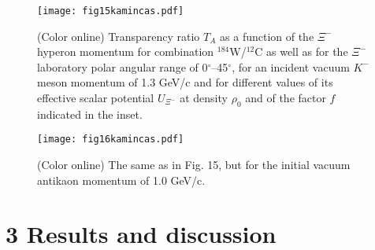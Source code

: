 \documentclass[12pt]{article}
\begin{document}
\begin{figure}[!h]
\begin{center}
\texttt{[image: fig15kamincas.pdf]}
\vspace*{-2mm} \caption{(Color online) Transparency ratio $T_A$ as a function of the $\Xi^-$  hyperon momentum
for combination $^{184}$W/$^{12}$C as well as for the $\Xi^-$ laboratory polar angular range of
0$^{\circ}$--45$^{\circ}$, for an incident vacuum $K^-$ meson momentum of 1.3 GeV/c and for
different values of its effective scalar potential $U_{\Xi^-}$ at density $\rho_0$ and of the factor $f$
indicated in the inset.}
\label{void}
\end{center}
\end{figure}
\begin{figure}[!h]
\begin{center}
\texttt{[image: fig16kamincas.pdf]}
\vspace*{-2mm} \caption{(Color online) The same as in Fig. 15,
but for the initial vacuum antikaon momentum of 1.0 GeV/c.}
\label{void}
\end{center}
\end{figure}

\section*{3 Results and discussion}
\end{document}

